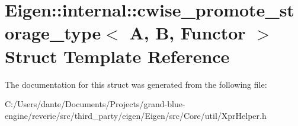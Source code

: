 \hypertarget{struct_eigen_1_1internal_1_1cwise__promote__storage__type}{}\section{Eigen\+::internal\+::cwise\+\_\+promote\+\_\+storage\+\_\+type$<$ A, B, Functor $>$ Struct Template Reference}
\label{struct_eigen_1_1internal_1_1cwise__promote__storage__type}


The documentation for this struct was generated from the following file\+:\begin{DoxyCompactItemize}
\item 
C\+:/\+Users/dante/\+Documents/\+Projects/grand-\/blue-\/engine/reverie/src/third\+\_\+party/eigen/\+Eigen/src/\+Core/util/Xpr\+Helper.\+h\end{DoxyCompactItemize}
